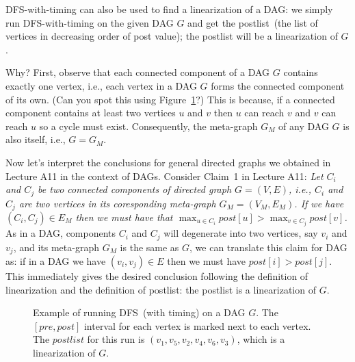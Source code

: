 DFS-with-timing can also be used to find a linearization of a DAG: we simply run DFS-with-timing on the given DAG $G$
and get the postlist~(the list of vertices in decreasing order of post value); the postlist will be a linearization of $G$.

Why? First, observe that each connected component of a DAG $G$ contains exactly one vertex, i.e., each vertex in a DAG $G$
forms the connected component of its own. (Can you spot this using Figure~\ref{fig:meta-graph}?)
This is because, if a connected component contains at least two vertices $u$ and $v$ then $u$ can reach $v$ and $v$ can reach $u$ so a cycle must exist.
Consequently, the meta-graph $G_M$ of any DAG $G$ is also itself, i.e., $G= G_M$. %

Now let's interpret the conclusions for general directed graphs we obtained in  Lecture A11 in the context of DAGs.
Consider Claim~1 in Lecture A11: \emph{Let $C_i$ and $C_j$ be two connected components of directed graph $G = (V, E)$, i.e., $C_i$ and $C_j$ are two
vertices in its coresponding meta-graph $G_M = (V_M, E_M)$. If we have $(C_i, C_j) \in E_M$ then
we must have that $\max_{u\in C_i} post[u] > \max_{v\in C_j} post[v]$.}
As in a DAG, components $C_i$ and $C_j$ will degenerate into two vertices, say $v_i$ and $v_j$, and
its meta-graph $G_M$ is the same as $G$, we can translate this claim for DAG as: 
if in a DAG we have $(v_i, v_j) \in E$ then we must have $post[i] > post[j]$.
This immediately gives the desired conclusion following the definition of linearization
and the definition of postlist: the postlist is a linearization of $G$.

\begin{figure}[h!]
\centering{}
\caption{Example of running DFS~(with timing) on a DAG $G$. The $[pre,post]$ interval for each vertex
is marked next to each vertex. The $postlist$ for this run is $(v_1, v_5, v_2, v_4, v_6, v_3)$, which is a linearization of $G$.}
\label{fig:meta-graph}
\end{figure}


